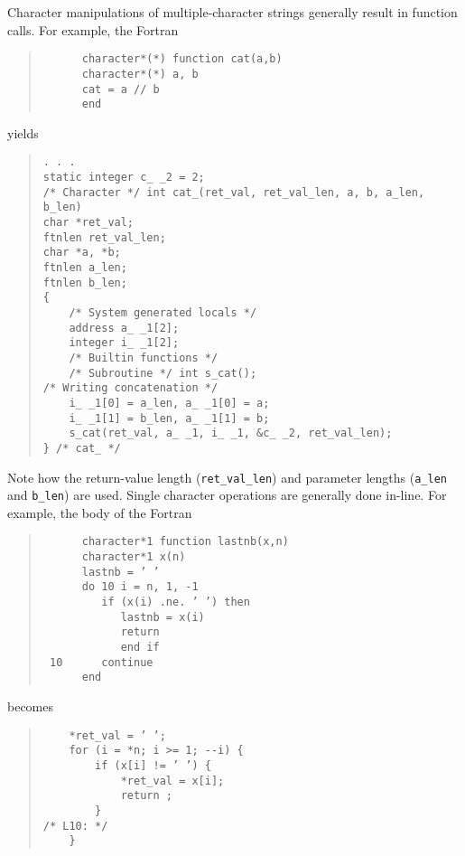 \documentclass[12pt]{article}
\begin{document}
Character manipulations of multiple-character strings generally result in function calls. For example, the Fortran
\begin{quote}
\begin{verbatim}
      character*(*) function cat(a,b)
      character*(*) a, b
      cat = a // b
      end
\end{verbatim}
\end{quote}
yields
\begin{quote}
\begin{verbatim}
. . .
static integer c_ _2 = 2;
/* Character */ int cat_(ret_val, ret_val_len, a, b, a_len, b_len)
char *ret_val;
ftnlen ret_val_len;
char *a, *b;
ftnlen a_len;
ftnlen b_len;
{
    /* System generated locals */
    address a_ _1[2];
    integer i_ _1[2];
    /* Builtin functions */
    /* Subroutine */ int s_cat();
/* Writing concatenation */
    i_ _1[0] = a_len, a_ _1[0] = a;
    i_ _1[1] = b_len, a_ _1[1] = b;
    s_cat(ret_val, a_ _1, i_ _1, &c_ _2, ret_val_len);
} /* cat_ */
\end{verbatim}
\end{quote}
Note how the return-value length (\verb|ret_val_len|) and parameter lengths (\verb|a_len| and \verb|b_len|) are used. Single character operations are generally done in-line. For example, the body of the Fortran
\begin{quote}
\begin{verbatim}
      character*1 function lastnb(x,n)
      character*1 x(n)
      lastnb = ’ ’
      do 10 i = n, 1, -1
         if (x(i) .ne. ’ ’) then
            lastnb = x(i)
            return
            end if
 10      continue
      end
\end{verbatim}
\end{quote}
becomes
\begin{quote}
\begin{verbatim}
    *ret_val = ’ ’;
    for (i = *n; i >= 1; --i) {
        if (x[i] != ’ ’) {
            *ret_val = x[i];
            return ;
        }
/* L10: */
    }
\end{verbatim}
\end{quote}
\end{document}
